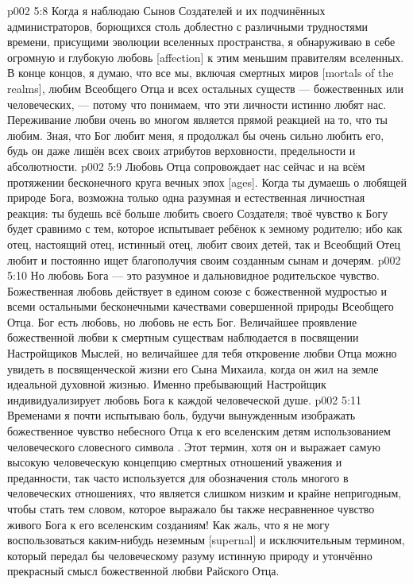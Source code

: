 \vs p002 5:8 Когда я наблюдаю Сынов Создателей и их подчинённых администраторов, борющихся столь доблестно с различными трудностями времени, присущими эволюции вселенных пространства, я обнаруживаю в себе огромную и глубокую любовь [affection] к этим меньшим правителям вселенных. В конце концов, я думаю, что все мы, включая смертных миров [mortals of the realms], любим Всеобщего Отца и всех остальных существ --- божественных или человеческих, --- потому что понимаем, что эти личности истинно любят нас. Переживание любви очень во многом является прямой реакцией на то, что ты любим. Зная, что Бог любит меня, я продолжал бы очень сильно любить его, будь он даже лишён всех своих атрибутов верховности, предельности и абсолютности.
\vs p002 5:9 Любовь Отца сопровождает нас сейчас и на всём протяжении бесконечного круга вечных эпох [ages]. Когда ты думаешь о любящей природе Бога, возможна только одна разумная и естественная личностная реакция: ты будешь всё больше любить своего Создателя; твоё чувство к Богу будет сравнимо с тем, которое испытывает ребёнок к земному родителю; ибо как отец, настоящий отец, истинный отец, любит своих детей, так и Всеобщий Отец любит и постоянно ищет благополучия своим созданным сынам и дочерям.
\vs p002 5:10 Но любовь Бога --- это разумное и дальновидное родительское чувство. Божественная любовь действует в едином союзе с божественной мудростью и всеми остальными бесконечными качествами совершенной природы Всеобщего Отца. Бог есть любовь, но любовь не есть Бог. Величайшее проявление божественной любви к смертным существам наблюдается в посвящении Настройщиков Мыслей, но величайшее для тебя откровение любви Отца можно увидеть в посвященческой жизни его Сына Михаила, когда он жил на земле идеальной духовной жизнью. Именно пребывающий Настройщик индивидуализирует любовь Бога к каждой человеческой душе.
\vs p002 5:11 \pc Временами я почти испытываю боль, будучи вынужденным изображать божественное чувство небесного Отца к его вселенским детям использованием человеческого словесного символа . Этот термин, хотя он и выражает самую высокую человеческую концепцию смертных отношений уважения и преданности, так часто используется для обозначения столь многого в человеческих отношениях, что является слишком низким и крайне непригодным, чтобы стать тем словом, которое выражало бы также несравненное чувство живого Бога к его вселенским созданиям! Как жаль, что я не могу воспользоваться каким\hyp{}нибудь неземным [supernal] и исключительным термином, который передал бы человеческому разуму истинную природу и утончённо прекрасный смысл божественной любви Райского Отца.
